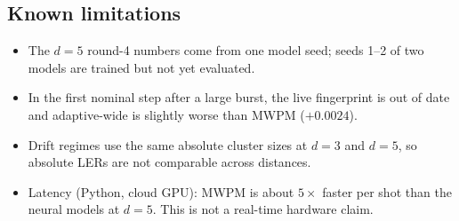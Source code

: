 \documentclass[11pt,a4paper]{article}
\begin{document}
\subsection{Known limitations}
\begin{itemize}
  \item The $d=5$ round-4 numbers come from one model seed; seeds 1--2 of two models are trained but not yet evaluated.
  \item In the first nominal step after a large burst, the live fingerprint is out of date and adaptive-wide is
        slightly worse than MWPM ($+0.0024$).
  \item Drift regimes use the same absolute cluster sizes at $d=3$ and $d=5$, so absolute LERs are not comparable
        across distances.
  \item Latency (Python, cloud GPU): MWPM is about $5\times$ faster per shot than the neural models at $d=5$.
        This is not a real-time hardware claim.
\end{itemize}
\end{document}
